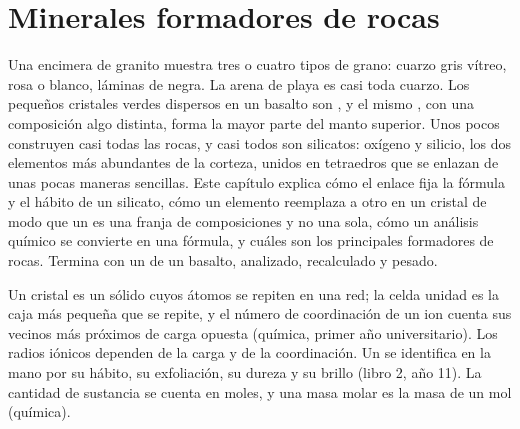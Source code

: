 \chapter{Minerales formadores de rocas}\label{ch:b1:rock-forming-minerals}

Una encimera de granito muestra tres o cuatro tipos de grano: cuarzo gris vítreo,  rosa o
blanco, láminas de  negra. La arena de playa es casi toda cuarzo. Los pequeños cristales verdes
dispersos en un basalto son , y el mismo , con una composición algo distinta, forma la
mayor parte del manto superior. Unos pocos  construyen casi todas las rocas, y casi todos son
silicatos: oxígeno y silicio, los dos elementos más abundantes de la corteza, unidos en tetraedros que se
enlazan de unas pocas maneras sencillas. Este capítulo explica cómo el enlace fija la fórmula y el hábito
de un silicato, cómo un elemento reemplaza a otro en un cristal de modo que un  es una franja de
composiciones y no una sola, cómo un análisis químico se convierte en una fórmula, y cuáles son los
principales  formadores de rocas. Termina con un  de un basalto, analizado, recalculado y pesado.

\begin{recall}
Un cristal es un sólido cuyos átomos se repiten en una red; la celda unidad es la caja más pequeña que
se repite, y el número de coordinación de un ion cuenta sus vecinos más próximos de carga opuesta
(química, primer año universitario). Los radios iónicos dependen de la carga y de la coordinación. Un
 se identifica en la mano por su hábito, su exfoliación, su dureza y su brillo (libro 2, año 11).
La cantidad de sustancia se cuenta en moles, y una masa molar es la masa de un mol (química).
\end{recall}

